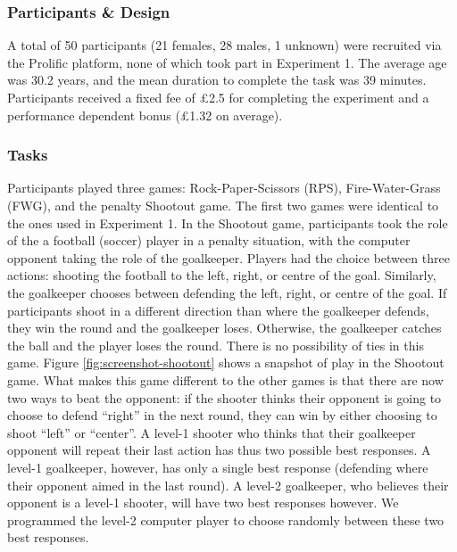 \documentclass[smallextended]{svjour3}       %
\begin{document}
\hypertarget{participants-design}{%
\subsubsection{Participants \& Design}\label{participants-design}}

A total of 50 participants (21 females, 28 males, 1 unknown) were
recruited via the Prolific platform, none of which took part in
Experiment 1. The average age was 30.2 years, and the mean duration to
complete the task was 39 minutes. Participants received a fixed fee of
£2.5 for completing the experiment and a performance dependent bonus
(£1.32 on average).

\hypertarget{tasks-1}{%
\subsubsection{Tasks}\label{tasks-1}}

Participants played three games: Rock-Paper-Scissors (RPS),
Fire-Water-Grass (FWG), and the penalty Shootout game. The first two
games were identical to the ones used in Experiment 1. In the Shootout
game, participants took the role of the a football (soccer) player in a
penalty situation, with the computer opponent taking the role of the
goalkeeper. Players had the choice between three actions: shooting the
football to the left, right, or centre of the goal. Similarly, the
goalkeeper chooses between defending the left, right, or centre of the
goal. If participants shoot in a different direction than where the
goalkeeper defends, they win the round and the goalkeeper loses.
Otherwise, the goalkeeper catches the ball and the player loses the
round. There is no possibility of ties in this game. Figure
\ref{fig:screenshot-shootout} shows a snapshot of play in the Shootout
game. What makes this game different to the other games is that there
are now two ways to beat the opponent: if the shooter thinks their
opponent is going to choose to defend ``right'' in the next round, they
can win by either choosing to shoot ``left'' or ``center''. A level-1
shooter who thinks that their goalkeeper opponent will repeat their last
action has thus two possible best responses. A level-1 goalkeeper,
however, has only a single best response (defending where their opponent
aimed in the last round). A level-2 goalkeeper, who believes their
opponent is a level-1 shooter, will have two best responses however. We
programmed the level-2 computer player to choose randomly between these
two best responses.
\end{document}
